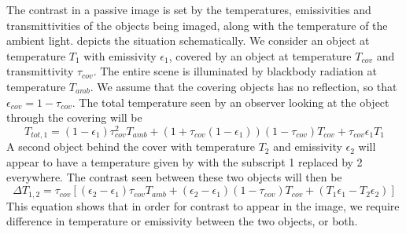 The contrast in a passive image is set by the temperatures, emissivities and transmittivities of the objects being imaged, along with the temperature of the ambient light.
 depicts the situation schematically.
We consider an object at temperature $T_{1}$ with emissivity $\epsilon_1$, covered by an object at temperature $T_{cov}$ and transmittivity $\tau_{cov}$.
The entire scene is illuminated by blackbody radiation at temperature $T_{amb}$.
We assume that the covering objects has no reflection, so that $\epsilon_{cov} = 1 - \tau_{cov}$.
The total temperature seen by an observer looking at the object through the covering will be
\begin{equation} \label{eqn:ch1-t-tot}
  T_{tot,1} = (1 - \epsilon_{1}) \tau_{cov}^2 T_{amb} + 
           (1 + \tau_{cov}(1 - \epsilon_{1}))(1-\tau_{cov}) T_{cov} + 
           \tau_{cov} \epsilon_{1} T_1
\end{equation}
A second object behind the cover with temperature $T_2$ and emissivity $\epsilon_2$ will appear to have a temperature given by  with the subscript 1 replaced by 2 everywhere.
The contrast seen between these two objects will then be
\begin{equation} \label{eqn:ch1-delta-t}
  \Delta T_{1,2} = \tau_{cov} \left[ (\epsilon_2 - \epsilon_1) \tau_{cov} T_{amb} + 
                                    (\epsilon_2 - \epsilon_1) (1-\tau_{cov}) T_{cov} + 
                                    (T_1 \epsilon_1 - T_2 \epsilon_2) \right]
\end{equation}
This equation shows that in order for contrast to appear in the image, we require difference in temperature or emissivity between the two objects, or both.

